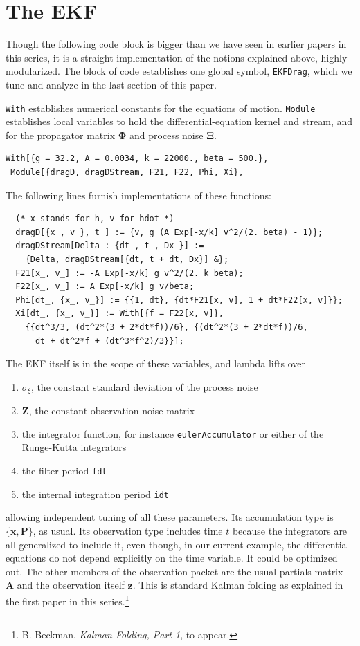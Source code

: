 \documentclass[10pt,oneside,x11names]{article}
\begin{document}
\section{The EKF}
\label{sec:orgheadline10}

Though the following code block is bigger than we have seen in earlier papers in
this series, it is a
straight implementation of the notions explained above, highly modularized. The
block of code establishes one global symbol, \texttt{EKFDrag}, which we tune and
analyze in the last section of this paper.

\texttt{With} establishes numerical constants for the equations of motion.
\texttt{Module} establishes local variables to hold the differential-equation kernel and
stream, and for the propagator matrix \(\mathbold{\Phi}\) and process noise
\(\mathbold{\Xi}\). 

\begin{verbatim}
With[{g = 32.2, A = 0.0034, k = 22000., beta = 500.},
 Module[{dragD, dragDStream, F21, F22, Phi, Xi},
\end{verbatim}

The following lines furnish implementations of these functions:

\begin{verbatim}
  (* x stands for h, v for hdot *)
  dragD[{x_, v_}, t_] := {v, g (A Exp[-x/k] v^2/(2. beta) - 1)};
  dragDStream[Delta : {dt_, t_, Dx_}] :=
    {Delta, dragDStream[{dt, t + dt, Dx}] &};
  F21[x_, v_] := -A Exp[-x/k] g v^2/(2. k beta);
  F22[x_, v_] := A Exp[-x/k] g v/beta;
  Phi[dt_, {x_, v_}] := {{1, dt}, {dt*F21[x, v], 1 + dt*F22[x, v]}};
  Xi[dt_, {x_, v_}] := With[{f = F22[x, v]},
    {{dt^3/3, (dt^2*(3 + 2*dt*f))/6}, {(dt^2*(3 + 2*dt*f))/6, 
      dt + dt^2*f + (dt^3*f^2)/3}}];
\end{verbatim}

The EKF itself is in the scope of these variables, and lambda lifts over 
\begin{enumerate}
\item \(\sigma_\xi\), the constant standard deviation of the process noise
\item \(\mathbold{Z}\), the constant observation-noise matrix
\item the integrator function, for instance \texttt{eulerAccumulator} or either of the
Runge-Kutta integrators
\item the filter period \texttt{fdt}
\item the internal integration period \texttt{idt}
\end{enumerate}
allowing independent tuning of all these parameters. Its accumulation type is
\(\{\mathbold{x},\mathbold{P}\}\), as usual. Its observation type includes time
\(t\) because the integrators are all generalized to include it, even though, in
our current example, the differential equations do not depend explicitly on the
time variable. It could be optimized out. The other members of the observation
packet are the usual partials matrix \(\mathbold{A}\) and the observation itself
\(\mathbold{z}\). This is standard Kalman folding as explained in the first paper
in this series.\footnote{B. Beckman, \emph{Kalman Folding, Part 1}, to appear.}
\end{document}
